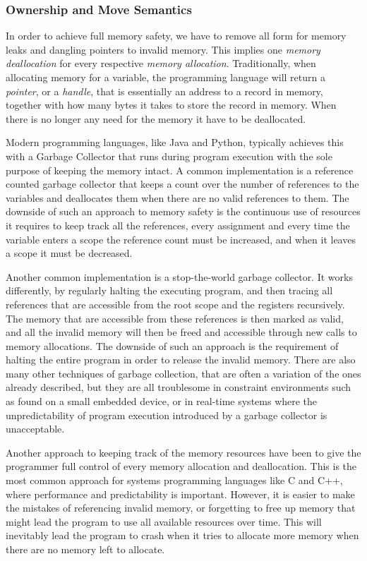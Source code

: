 \subsubsection{Ownership and Move Semantics}
\label{sec:back:rust:own}

In order to achieve full memory safety, we have to remove all form for memory leaks and dangling pointers to invalid memory.
This implies one \emph{memory deallocation} for every respective \emph{memory allocation}.
Traditionally, when allocating memory for a variable, the programming language will return a \emph{pointer},  or a \emph{handle}, that is essentially an address to a record in memory, together with how many bytes it takes to store the record in memory.
When there is no longer any need for the memory it have to be deallocated.

Modern programming languages, like Java and Python, typically achieves this with a Garbage Collector that runs during program execution with the sole purpose of keeping the memory intact.
A common implementation is a reference counted garbage collector that keeps a count over the number of references to the variables and deallocates them when there are no valid references to them.
The downside of such an approach to memory safety is the continuous use of resources it requires to keep track all the references, every assignment and every time the variable enters a scope the reference count must be increased, and when it leaves a scope it must be decreased.

Another common implementation is a stop-the-world garbage collector.
It works differently, by regularly halting the executing program, and then tracing all references that are accessible from the root scope and the registers recursively.
The memory that are accessible from these references is then marked as valid, and all the invalid memory will then be freed and accessible through new calls to memory allocations.
The downside of such an approach is the requirement of halting the entire program in order to release the invalid memory.
There are also many other techniques of garbage collection, that are often a variation of the ones already described, but they are all troublesome in constraint environments such as found on a small embedded device, or in real-time systems where the unpredictability of program execution introduced by a garbage collector is unacceptable.

Another approach to keeping track of the memory resources have been to give the programmer full control of every memory allocation and deallocation.
This is the most common approach for systems programming languages like C and C++, where performance and predictability is important.
However, it is easier to make the mistakes of referencing invalid memory, or forgetting to free up memory that might lead the program to use all available resources over time.
This will inevitably lead the program to crash when it tries to allocate more memory when there are no memory left to allocate.

